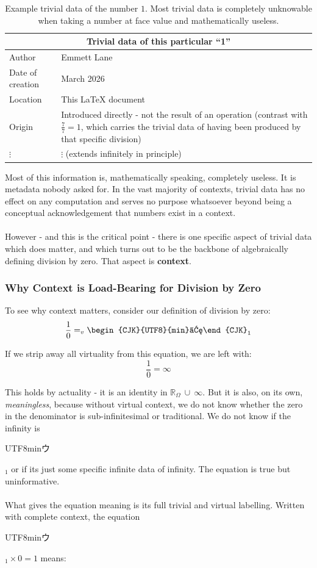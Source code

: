 \documentclass{article}
\newcommand{\U}{\begin{CJK}{UTF8}{min}ウ\end{CJK}}
\begin{document}
\begin{table}[H]
\centering
\begin{tabular}{|l|p{9cm}|}
\hline
\multicolumn{2}{|c|}{\textbf{Trivial data of this particular ``1''}} \\
\hline
Author & Emmett Lane \\
Date of creation & March 2026 \\
Location & This \LaTeX{} document \\
Origin & Introduced directly - not the result of an operation (contrast 
with $\frac{7}{7} = 1$, which carries the trivial data of having been 
produced by that specific division) \\
$\vdots$ & $\vdots$ (extends infinitely in principle) \\
\hline
\end{tabular}
\caption{Example trivial data of the number $1$. Most trivial data is 
completely unknowable when taking a number at face value and mathematically useless.}
\label{tab:trivial-data-example}
\end{table}

Most of this information is, mathematically speaking, completely useless. 
It is metadata nobody asked for. In the vast majority of contexts, trivial 
data has no effect on any computation and serves no purpose whatsoever 
beyond being a conceptual acknowledgement that numbers exist in a context.\\\\
However - and this is the critical point - there is one specific aspect 
of trivial data which does matter, and which turns out to be the backbone 
of algebraically defining division by zero. That aspect is 
\textbf{context}.

\subsubsection{Why Context is Load-Bearing for Division by Zero}

To see why context matters, consider our definition of division by zero:
$$\frac{1}{0} =_v \text{\U}_1$$

If we strip away all virtuality from this equation, we are left with:
$$\frac{1}{0} = \infty$$

This holds by actuality - it is an identity in  $\mathbb{R}_\Omega \ \cup \ \infty$. But it is also, on its own, \textit{meaningless}, because without virtual context, 
we do not know whether the zero in the denominator is sub-infinitesimal 
or traditional. We do not know if the infinity is \U$_1$ or if its just some specific infinite data of infinity. The equation 
is true but uninformative.\\\\
What gives the equation meaning is its full trivial and virtual labelling. 
Written with complete context, the equation \U$_1 \times 0 = 1$ means:
\end{document}

